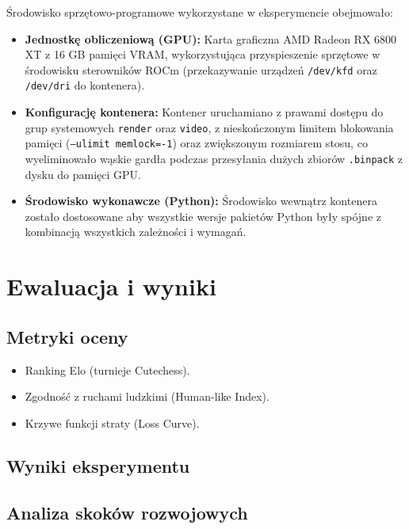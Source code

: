 \documentclass[12pt,a4paper]{report}
\begin{document}
Środowisko sprzętowo-programowe wykorzystane w eksperymencie obejmowało:

\begin{itemize}
    \item \textbf{Jednostkę obliczeniową (GPU):} Karta graficzna AMD Radeon RX 6800 XT z 16 GB pamięci VRAM, wykorzystująca przyspieszenie sprzętowe w środowisku sterowników ROCm (przekazywanie urządzeń \texttt{/dev/kfd} oraz \texttt{/dev/dri} do kontenera).
    \item \textbf{Konfigurację kontenera:} Kontener uruchamiano z prawami dostępu do grup systemowych \texttt{render} oraz \texttt{video}, z nieskończonym limitem blokowania pamięci (\texttt{--ulimit memlock=-1}) oraz zwiększonym rozmiarem stosu, co wyeliminowało wąskie gardła podczas przesyłania dużych zbiorów \texttt{.binpack} z dysku do pamięci GPU.
    \item \textbf{Środowisko wykonawcze (Python):} Środowisko wewnątrz kontenera zostało dostosowane aby wszystkie wersje pakietów Python były spójne z kombinacją wszystkich zależności i wymagań.
\end{itemize}

\chapter{Ewaluacja i wyniki}

\section{Metryki oceny}

\begin{itemize}
    \item Ranking Elo (turnieje Cutechess).
    \item Zgodność z ruchami ludzkimi (Human-like Index).
    \item Krzywe funkcji straty (Loss Curve).
\end{itemize}

\section{Wyniki eksperymentu}


\section{Analiza skoków rozwojowych}
\end{document}
